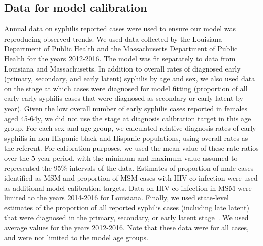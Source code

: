 \documentclass[a4paper]{article}
\begin{document}
\subsection{Data for model calibration}
\label{subsec:data}

Annual data on syphilis reported cases were used to ensure our model was reproducing observed trends. We used data collected by the Louisiana Department of Public Health and the Massachusetts Department of Public Health for the years 2012-2016. The model was fit separately to data from Louisiana and Massachusetts. In addition to overall rates of diagnosed early (primary, secondary, and early latent) syphilis by age and sex, we also used data on the stage at which cases were diagnosed for model fitting (proportion of all early early syphilis cases that were diagnosed as secondary or early latent by year). Given the low overall number of early syphilis cases reported in females aged 45-64y, we did not use the stage at diagnosis calibration target in this age group. For each sex and age group, we calculated relative diagnosis rates of early syphilis in non-Hispanic black and Hispanic populations, using overall rates as the referent. For calibration purposes, we used the mean value of these rate ratios over the 5-year period, with the minimum and maximum value assumed to represented the 95\% intervals of the data. Estimates of proportion of male cases identified as MSM and proportion of MSM cases with HIV co-infection were used as additional model calibration targets. Data on HIV co-infection in MSM were limited to the years 2014-2016 for Louisiana. Finally, we used state-level estimates of the proportion of all reported syphilis cases (including late latent) that were diagnosed in the primary, secondary, or early latent stage~\autocite{cdc2017}. We used average values for the years 2012-2016. Note that these data were for all cases, and were not limited to the model age groups. 

\newpage
\printbibliography 
\end{document}
